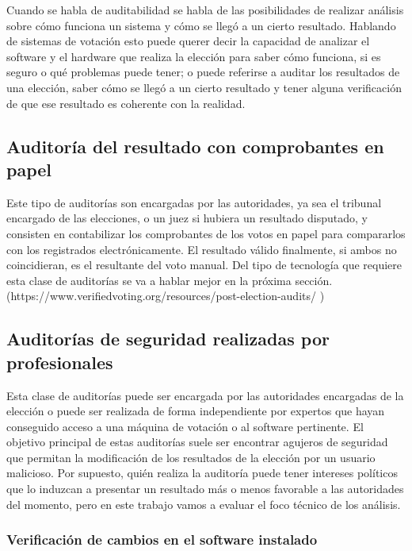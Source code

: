 Cuando se habla de auditabilidad se habla de las posibilidades de realizar análisis sobre cómo funciona un sistema y cómo se llegó a un cierto resultado. Hablando de sistemas de votación esto puede querer decir la capacidad de analizar el software y el hardware que realiza la elección para saber cómo funciona, si es seguro o qué problemas puede tener; o puede referirse a auditar los resultados de una elección, saber cómo se llegó a un cierto resultado y tener alguna verificación de que ese resultado es coherente con la realidad.

\subsection{Auditoría del resultado con comprobantes en papel}

Este tipo de auditorías son encargadas por las autoridades, ya sea el tribunal encargado de las elecciones, o un juez si hubiera un resultado disputado, y consisten en contabilizar los comprobantes de los votos en papel para compararlos con los registrados electrónicamente. El resultado válido finalmente, si ambos no coincidieran, es el resultante del voto manual. Del tipo de tecnología que requiere esta clase de auditorías se va a hablar mejor en la próxima sección.
(https://www.verifiedvoting.org/resources/post-election-audits/ )

\subsection{Auditorías de seguridad realizadas por profesionales}

Esta clase de auditorías puede ser encargada por las autoridades encargadas de la elección o puede ser realizada de forma independiente por expertos que hayan conseguido acceso a una máquina de votación o al software pertinente. El objetivo principal de estas auditorías suele ser encontrar agujeros de seguridad que permitan la modificación de los resultados de la elección por un usuario malicioso. Por supuesto, quién realiza la auditoría puede tener intereses políticos que lo induzcan a presentar un resultado más o menos favorable a las autoridades del momento, pero en este trabajo vamos a evaluar el foco técnico de los análisis.

\subsubsection{Verificación de cambios en el software instalado}


